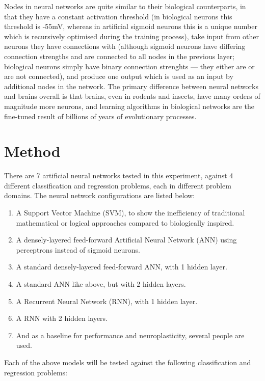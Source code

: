 \documentclass[]{report}
\begin{document}
Nodes in neural networks are quite similar to their biological counterparts, in that they have a constant activation threshold (in biological neurons this threshold is -55mV, whereas in artificial sigmoid neurons this is a unique number which is recursively optimised during the training process), take input from other neurons they have connections with (although sigmoid neurons have differing connection strengths and are connected to all nodes in the previous layer; biological neurons simply have binary connection strenghts --- they either are or are not connected), and produce one output which is used as an input by additional nodes in the network. The primary difference between neural networks and brains overall is that brains, even in rodents and insects, have many orders of magnitude more neurons, and learning algorithms in biological networks are the fine-tuned result of billions of years of evolutionary processes.

\label{itm:Method}
\section{Method}

There are 7 artificial neural networks tested in this experiment, against 4 different classification and regression problems, each in different problem domains. The neural network configurations are listed below:

\begin{enumerate}
	\item A Support Vector Machine (SVM), to show the inefficiency of traditional mathematical or logical approaches compared to biologically inspired.
	\item A densely-layered feed-forward Artificial Neural Network (ANN) using perceptrons instead of sigmoid neurons.
	\item A standard densely-layered feed-forward ANN, with 1 hidden layer.
	\item A standard ANN like above, but with 2 hidden layers.
	\item A Recurrent Neural Network (RNN), with 1 hidden layer.
	\item A RNN with 2 hidden layers.
	\item And as a baseline for performance and neuroplasticity, several people are used.
\end{enumerate}

Each of the above models will be tested against the following classification and regression problems:
\end{document}
